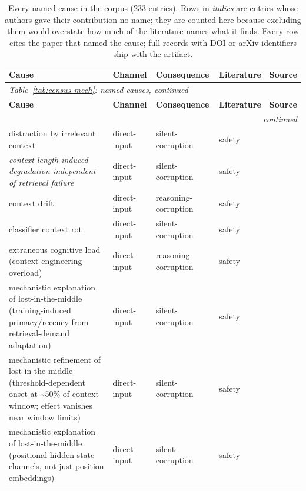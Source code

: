 \begingroup
\footnotesize
\setlength{\tabcolsep}{3.5pt}
\begin{longtable}{@{}p{}llll@{}}
\caption{Every named cause in the corpus (233 entries). Rows in \emph{italics} are entries whose authors gave their contribution no name; they are counted here because excluding them would overstate how much of the literature names what it finds. Every row cites the paper that named the cause; full records with DOI or arXiv identifiers ship with the artifact.}\\
\toprule
\textbf{Cause} & \textbf{Channel} & \textbf{Consequence} & \textbf{Literature} & \textbf{Source} \\
\midrule
\endfirsthead
\multicolumn{5}{l}{\emph{Table~\ref{tab:census-mech}: named causes, continued}} \\
\toprule
\textbf{Cause} & \textbf{Channel} & \textbf{Consequence} & \textbf{Literature} & \textbf{Source} \\
\midrule
\endhead
\midrule
\multicolumn{5}{r}{\emph{continued}} \\
\endfoot
\bottomrule
\endlastfoot
distraction by irrelevant context & direct-input & silent-corruption & safety & \cite{shi-2023-large} \\
\emph{context-length-induced degradation independent of retrieval failure} & direct-input & silent-corruption & safety & \cite{du-2025-context} \\
context drift & direct-input & reasoning-corruption & safety & \cite{dongre-2025-drift} \\
classifier context rot & direct-input & silent-corruption & safety & \cite{martin-2026-classifier} \\
extraneous cognitive load (context engineering overload) & direct-input & reasoning-corruption & safety & \cite{shang-2025-united} \\
mechanistic explanation of lost-in-the-middle (training-induced primacy/recency from retrieval-demand adaptation) & direct-input & silent-corruption & safety & \cite{salvatore-2025-lost} \\
mechanistic refinement of lost-in-the-middle (threshold-dependent onset at \textasciitilde{}50\% of context window; effect vanishes near window limits) & direct-input & silent-corruption & safety & \cite{veseli-2025-positional} \\
mechanistic explanation of lost-in-the-middle (positional hidden-state channels, not just position embeddings) & direct-input & silent-corruption & safety & \cite{yu-2024-mitigate} \\

\end{longtable}
